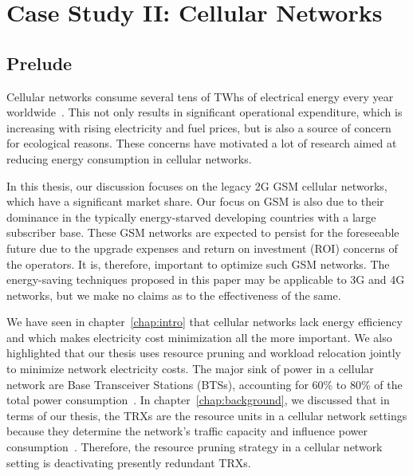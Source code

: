 \chapter{Case Study II: Cellular Networks}
\label{chap:casestudy2}
\section{Prelude}
Cellular networks consume several tens of TWhs of electrical energy
every year worldwide~\cite{Oh:Comm:2011}. This not only results
in significant operational expenditure, which is increasing with
rising electricity and fuel prices, but is also a source of concern
for ecological reasons. These concerns have motivated a lot of research aimed at reducing energy consumption in cellular networks.

In this thesis, our discussion focuses on the legacy 2G GSM cellular networks, which have a significant market share. Our focus on GSM is also due to their dominance in the typically energy-starved developing countries with a large subscriber base. These GSM networks are expected to persist for the foreseeable future due to the upgrade expenses and return on investment (ROI) concerns of the operators. It is, therefore, important to optimize such GSM networks. The energy-saving techniques proposed in this paper may be applicable to 3G and 4G networks, but we make no claims as to the effectiveness of the same. 
 
We have seen in chapter~\ref{chap:intro} that cellular networks lack energy efficiency and which makes electricity cost minimization all the more important. We also highlighted that our thesis uses resource pruning and workload relocation jointly to minimize network electricity costs. The major sink of power in a cellular network are Base Transceiver Stations (BTSs), accounting for 60\% to 80\% of the total power consumption~\cite{Louhi:2007:BTSPower:INTELEC,Oh:Comm:2011,Peng:2011:BTSSaving:Mobicom}. In chapter~\ref{chap:background}, we discussed that in terms of our thesis, the TRXs are the resource units in a cellular network settings because they determine the network's traffic capacity and influence power consumption~\cite{Peng:2011:BTSSaving:Mobicom}. Therefore, the resource pruning strategy in a cellular network setting is deactivating presently redundant TRXs. 

